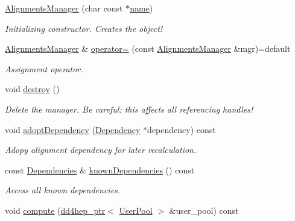 \begin{DoxyCompactItemize}
\hyperlink{class_d_d4hep_1_1_alignments_1_1_alignments_manager_a7999f59e5ea1524757ff4ae11286d0b0}{Alignments\+Manager} (char const $\ast$\hyperlink{class_d_d4hep_1_1_handle_a27c7d467a609ab32c133e1f3c7d85ef5}{name})
\begin{DoxyCompactList}\small\item\em Initializing constructor. Creates the object! \end{DoxyCompactList}\item 
\hyperlink{class_d_d4hep_1_1_alignments_1_1_alignments_manager}{Alignments\+Manager} \& \hyperlink{class_d_d4hep_1_1_alignments_1_1_alignments_manager_a6ec14b52aad01497dabaebbf76aa0a43}{operator=} (const \hyperlink{class_d_d4hep_1_1_alignments_1_1_alignments_manager}{Alignments\+Manager} \&mgr)=default
\begin{DoxyCompactList}\small\item\em Assignment operator. \end{DoxyCompactList}\item 
void \hyperlink{class_d_d4hep_1_1_alignments_1_1_alignments_manager_aa4254e4ad73fb728b05d8c4134f1b7ac}{destroy} ()
\begin{DoxyCompactList}\small\item\em Delete the manager. Be careful\+: this affects all referencing handles! \end{DoxyCompactList}\item 
void \hyperlink{class_d_d4hep_1_1_alignments_1_1_alignments_manager_a610c132f3f20bb3a24ff3e06eef0b901}{adopt\+Dependency} (\hyperlink{class_d_d4hep_1_1_alignments_1_1_alignments_manager_a62dad65e1472f8939e5a83f859e96d26}{Dependency} $\ast$dependency) const
\begin{DoxyCompactList}\small\item\em Adopy alignment dependency for later recalculation. \end{DoxyCompactList}\item 
const \hyperlink{class_d_d4hep_1_1_alignments_1_1_alignments_manager_ae8068cb8b252db1243c87eccad69e980}{Dependencies} \& \hyperlink{class_d_d4hep_1_1_alignments_1_1_alignments_manager_a3b8e5bdbb4729648a65289235fd80c61}{known\+Dependencies} () const
\begin{DoxyCompactList}\small\item\em Access all known dependencies. \end{DoxyCompactList}\item 
void \hyperlink{class_d_d4hep_1_1_alignments_1_1_alignments_manager_acc151cb6bf84d9113f6fe02463ad7c3e}{compute} (\hyperlink{class_d_d4hep_1_1dd4hep__ptr}{dd4hep\+\_\+ptr}$<$ \hyperlink{class_d_d4hep_1_1_conditions_1_1_user_pool}{User\+Pool} $>$ \&user\+\_\+pool) const

\end{DoxyCompactItemize}
